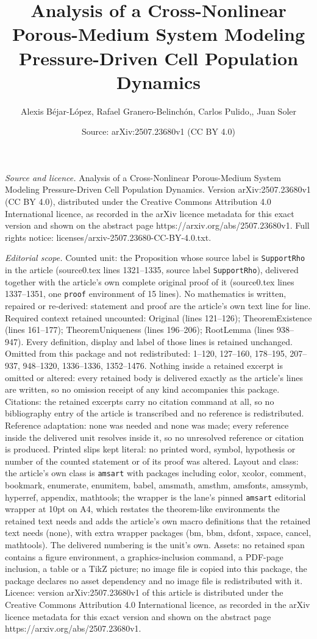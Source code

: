 \documentclass[10pt,a4paper]{amsart}
\title[Analysis of a Cross-Nonlinear Porous-Medium System Modeling ]{Analysis of a Cross-Nonlinear Porous-Medium System Modeling Pressure-Driven Cell Population Dynamics}
\author{Alexis B\'ejar-L\'opez, Rafael Granero-Belinch\'on, Carlos Pulido,, Juan Soler}
\date{Source: arXiv:2507.23680v1 (CC BY 4.0)}
\begin{document}
\maketitle

\noindent\emph{Source and licence.} Analysis of a Cross-Nonlinear Porous-Medium System Modeling Pressure-Driven Cell Population Dynamics. Version arXiv:2507.23680v1 (CC BY 4.0), distributed under the Creative Commons Attribution 4.0 International licence, as recorded in the arXiv licence metadata for this exact version and shown on the abstract page https://arxiv.org/abs/2507.23680v1. Full rights notice: licenses/arxiv-2507.23680-CC-BY-4.0.txt.\par\smallskip

\noindent\textit{Editorial scope.} Counted unit: the Proposition whose source label is \texttt{SupportRho} in the article (source0.tex lines 1321--1335, source label \texttt{SupportRho}), delivered together with the article's own complete original proof of it (source0.tex lines 1337--1351, one \texttt{proof} environment of 15 lines). No mathematics is written, repaired or re-derived: statement and proof are the article's own text line for line. Required context retained uncounted: Original (lines 121--126); TheoremExistence (lines 161--177); TheoremUniqueness (lines 196--206); RootLemma (lines 938--947). Every definition, display and label of those lines is retained unchanged. Omitted from this package and not redistributed: 1--120, 127--160, 178--195, 207--937, 948--1320, 1336--1336, 1352--1476. Nothing inside a retained excerpt is omitted or altered: every retained body is delivered exactly as the article's lines are written, so no omission receipt of any kind accompanies this package. Citations: the retained excerpts carry no citation command at all, so no bibliography entry of the article is transcribed and no reference is redistributed. Reference adaptation: none was needed and none was made; every reference inside the delivered unit resolves inside it, so no unresolved reference or citation is produced. Printed slips kept literal: no printed word, symbol, hypothesis or number of the counted statement or of its proof was altered. Layout and class: the article's own class is \texttt{amsart} with packages including color, xcolor, comment, bookmark, enumerate, enumitem, babel, amsmath, amsthm, amsfonts, amssymb, hyperref, appendix, mathtools; the wrapper is the lane's pinned \texttt{amsart} editorial wrapper at 10pt on A4, which restates the theorem-like environments the retained text needs and adds the article's own macro definitions that the retained text needs (none), with extra wrapper packages (bm, bbm, dsfont, xspace, cancel, mathtools). The delivered numbering is the unit's own. Assets: no retained span contains a figure environment, a graphics-inclusion command, a PDF-page inclusion, a table or a TikZ picture; no image file is copied into this package, the package declares no asset dependency and no image file is redistributed with it. Licence: version arXiv:2507.23680v1 of this article is distributed under the Creative Commons Attribution 4.0 International licence, as recorded in the arXiv licence metadata for this exact version and shown on the abstract page https://arxiv.org/abs/2507.23680v1. 
\end{document}
